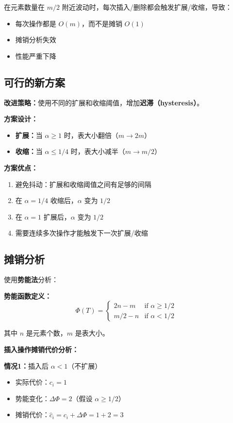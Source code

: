 \documentclass[UTF8,12pt,a4paper]{ctexart}
\begin{document}
在元素数量在 $m/2$ 附近波动时，每次插入/删除都会触发扩展/收缩，导致：
\begin{itemize}
	\item 每次操作都是 $O(m)$，而不是摊销 $O(1)$
	\item 摊销分析失效
	\item 性能严重下降
\end{itemize}

\subsection*{可行的新方案}

\textbf{改进策略：}使用不同的扩展和收缩阈值，增加\textbf{迟滞（hysteresis）}。

\textbf{方案设计：}
\begin{itemize}
	\item \textbf{扩展：}当 $\alpha \geq 1$ 时，表大小翻倍（$m \rightarrow 2m$）
	\item \textbf{收缩：}当 $\alpha \leq 1/4$ 时，表大小减半（$m \rightarrow m/2$）
\end{itemize}

\textbf{方案优点：}
\begin{enumerate}
	\item 避免抖动：扩展和收缩阈值之间有足够的间隔
	\item 在 $\alpha = 1/4$ 收缩后，$\alpha$ 变为 $1/2$
	\item 在 $\alpha = 1$ 扩展后，$\alpha$ 变为 $1/2$
	\item 需要连续多次操作才能触发下一次扩展/收缩
\end{enumerate}

\subsection*{摊销分析}

使用\textbf{势能法}分析：

\textbf{势能函数定义：}
$$\Phi(T) = \begin{cases}
2n - m & \text{if } \alpha \geq 1/2 \\
m/2 - n & \text{if } \alpha < 1/2
\end{cases}$$

其中 $n$ 是元素个数，$m$ 是表大小。

\textbf{插入操作摊销代价分析：}

\textbf{情况1：}插入后 $\alpha < 1$（不扩展）
\begin{itemize}
	\item 实际代价：$c_i = 1$
	\item 势能变化：$\Delta \Phi = 2$（假设 $\alpha \geq 1/2$）
	\item 摊销代价：$\hat{c}_i = c_i + \Delta \Phi = 1 + 2 = 3$
\end{itemize}
\end{document}
